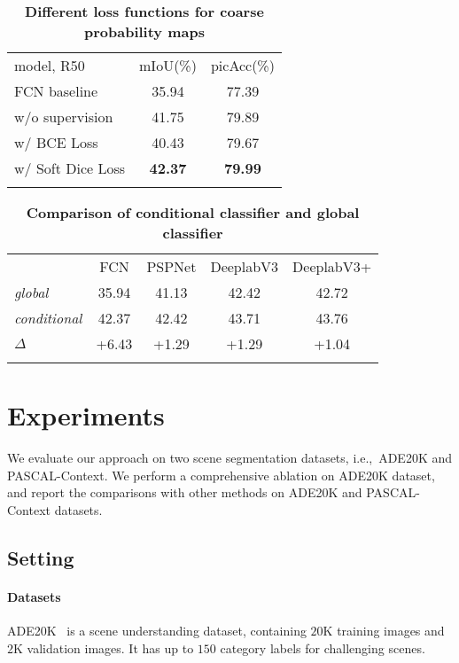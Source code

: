 \documentclass[journal]{IEEEtran}
\def\ie{i.e.,~}
\begin{document}
\begin{table}[t]
\centering
\setlength{\tabcolsep}{6.0pt}
\small
\renewcommand{\arraystretch}{1.4}
\caption{\textbf{Different loss functions for coarse probability maps}}
\label{tab:loss_function}
\begin{tabular}{l|c|c}
\shline
model, R50 & mIoU(\%) & picAcc(\%)\\ 
\shline
FCN baseline & 35.94 & 77.39 \\
\hline
w/o supervision & 41.75 & 79.89 \\
w/ BCE Loss & 40.43 & 79.67 \\
w/ Soft Dice Loss & \textbf{42.37} & \textbf{79.99} \\ 
\shline	
\end{tabular}
\end{table}	

\begin{table}[t]
\centering
\setlength{\tabcolsep}{5.0pt}
\small
\renewcommand{\arraystretch}{1.4}
\caption{\textbf{Comparison of conditional classifier and global classifier}}
\label{tab:cond_classifier}
\begin{tabular}{l|c|c|c|c}
\shline
\multicolumn{1}{c|}{classifier} & FCN & PSPNet & DeeplabV3 & DeeplabV3+ \\ 
\shline
\emph{global} &  35.94 & 41.13 & 42.42 & 42.72 \\
\emph{conditional} & 42.37 & 42.42 & 43.71 & 43.76 \\
\hline
$\Delta$ & +6.43 & +1.29 & +1.29 & +1.04 \\
\shline	
\end{tabular}
\end{table}	


\section{Experiments}
We evaluate our approach on two scene segmentation datasets, \ie ADE20K and PASCAL-Context.
We perform a comprehensive ablation
on ADE20K dataset, and
report the comparisons 
with other methods on ADE20K and PASCAL-Context datasets.

\subsection{Setting}
\paragraph{Datasets}
ADE20K~\cite{Zhou-ADE-2016} is a scene understanding dataset,
containing $20$K training images and $2$K validation images. 
It has up to $150$ category labels for challenging scenes.
\end{document}
